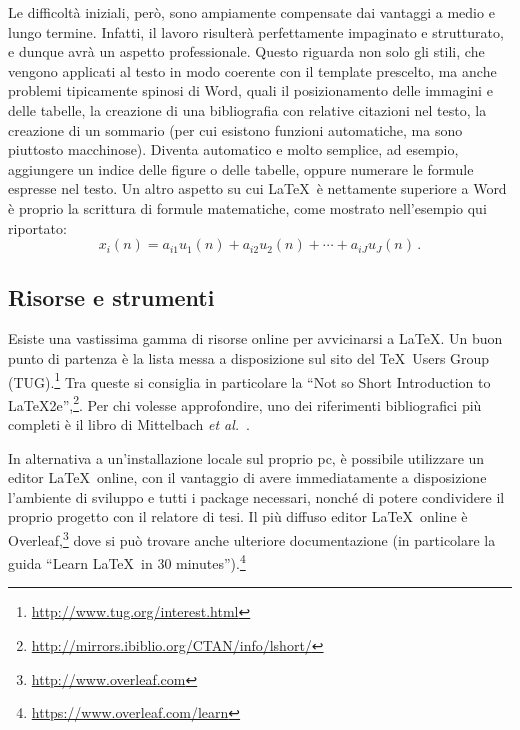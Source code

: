 \documentclass[12pt]{report}
\begin{document}
Le difficoltà iniziali, però, sono ampiamente compensate dai vantaggi a medio e lungo termine. Infatti, il lavoro risulterà perfettamente impaginato e strutturato, e dunque avrà un aspetto professionale. Questo riguarda non solo gli stili, che vengono applicati al testo in modo coerente con il template prescelto, ma anche problemi tipicamente spinosi di Word, quali il posizionamento delle immagini e delle tabelle, la creazione di una bibliografia con relative citazioni nel testo, la creazione di un sommario (per cui esistono funzioni automatiche, ma sono piuttosto macchinose). Diventa automatico e molto semplice, ad esempio, aggiungere un indice delle figure o delle tabelle, oppure numerare le formule espresse nel testo. Un altro aspetto su cui \LaTeX\ è nettamente superiore a Word è proprio la scrittura di formule matematiche, come mostrato nell'esempio qui riportato:
\begin{equation}
x_i(n) = a_{i1}u_1(n) + a_{i2}u_2(n) + \cdots + a_{iJ}u_J(n) \, .
\label{eq:multimix}
\end{equation}

\subsection{Risorse e strumenti}

Esiste una vastissima gamma di risorse online per avvicinarsi a \LaTeX. Un buon punto di partenza \`e la lista messa a disposizione sul sito del \TeX\ Users Group (TUG).\footnote{\url{http://www.tug.org/interest.html}}
Tra queste si consiglia in particolare la ``Not so Short Introduction to LaTeX2e'',\footnote{\url{http://mirrors.ibiblio.org/CTAN/info/lshort/}}. Per chi volesse approfondire, uno dei riferimenti bibliografici pi\`u completi \`e il libro di Mittelbach {\em et al.}~\cite{mittelbach2004latex}.

In alternativa a un'installazione locale sul proprio pc, \`e possibile utilizzare un editor \LaTeX\ online, con il vantaggio di avere immediatamente a disposizione l'ambiente di sviluppo e tutti i package necessari, nonch\'e di potere condividere il proprio progetto con il relatore di tesi. Il pi\`u diffuso editor \LaTeX\ online \`e Overleaf,\footnote{\url{http://www.overleaf.com}} dove si pu\`o trovare anche ulteriore documentazione (in particolare la guida ``Learn \LaTeX\ in 30 minutes'').\footnote{\url{https://www.overleaf.com/learn}}
\end{document}
